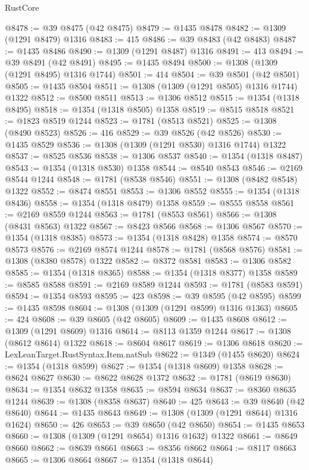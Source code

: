 \begin{lexlean}{RustCore}
\begin{coremodule}
@8478 := @39 @8475 (@42 @8475)
@8479 := @1435 @8478
@8482 := @1309 (@1291 @8479) @1316
@8483 := 415
@8486 := @39 @8483 (@42 @8483)
@8487 := @1435 @8486
@8490 := @1309 (@1291 @8487) @1316
@8491 := 413
@8494 := @39 @8491 (@42 @8491)
@8495 := @1435 @8494
@8500 := @1308 (@1309 (@1291 @8495) @1316 @1744)
@8501 := 414
@8504 := @39 @8501 (@42 @8501)
@8505 := @1435 @8504
@8511 := @1308 (@1309 (@1291 @8505) @1316 @1744) @1322
@8512 := @8500 @8511
@8513 := @1306 @8512
@8515 := @1354 (@1318 @8495)
@8518 := @1354 (@1318 @8505) @1358
@8519 := @8515 @8518
@8521 := @1823 @8519 @1244
@8523 := @1781 (@8513 @8521)
@8525 := @1308 (@8490 @8523)
@8526 := 416
@8529 := @39 @8526 (@42 @8526)
@8530 := @1435 @8529
@8536 := @1308 (@1309 (@1291 @8530) @1316 @1744) @1322
@8537 := @8525 @8536
@8538 := @1306 @8537
@8540 := @1354 (@1318 @8487)
@8543 := @1354 (@1318 @8530) @1358
@8544 := @8540 @8543
@8546 := @2169 @8544 @1244
@8548 := @1781 (@8538 @8546)
@8551 := @1308 (@8482 @8548) @1322
@8552 := @8474 @8551
@8553 := @1306 @8552
@8555 := @1354 (@1318 @8436)
@8558 := @1354 (@1318 @8479) @1358
@8559 := @8555 @8558
@8561 := @2169 @8559 @1244
@8563 := @1781 (@8553 @8561)
@8566 := @1308 (@8431 @8563) @1322
@8567 := @8423 @8566
@8568 := @1306 @8567
@8570 := @1354 (@1318 @8385)
@8573 := @1354 (@1318 @8428) @1358
@8574 := @8570 @8573
@8576 := @2169 @8574 @1244
@8578 := @1781 (@8568 @8576)
@8581 := @1308 (@8380 @8578) @1322
@8582 := @8372 @8581
@8583 := @1306 @8582
@8585 := @1354 (@1318 @8365)
@8588 := @1354 (@1318 @8377) @1358
@8589 := @8585 @8588
@8591 := @2169 @8589 @1244
@8593 := @1781 (@8583 @8591)
@8594 := @1354 @8593
@8595 := 423
@8598 := @39 @8595 (@42 @8595)
@8599 := @1435 @8598
@8604 := @1308 (@1309 (@1291 @8599) @1316 @1363)
@8605 := 424
@8608 := @39 @8605 (@42 @8605)
@8609 := @1435 @8608
@8612 := @1309 (@1291 @8609) @1316
@8614 := @8113 @1359 @1244
@8617 := @1308 (@8612 @8614) @1322
@8618 := @8604 @8617
@8619 := @1306 @8618
@8620 := LexLeanTarget.RustSyntax.Item.natSub
@8622 := @1349 (@1455 @8620)
@8624 := @1354 (@1318 @8599)
@8627 := @1354 (@1318 @8609) @1358
@8628 := @8624 @8627
@8630 := @8622 @8628 @1372
@8632 := @1781 (@8619 @8630)
@8634 := @1354 @8632 @1358
@8635 := @8594 @8634
@8637 := @8360 @8635 @1244
@8639 := @1308 (@8358 @8637)
@8640 := 425
@8643 := @39 @8640 (@42 @8640)
@8644 := @1435 @8643
@8649 := @1308 (@1309 (@1291 @8644) @1316 @1624)
@8650 := 426
@8653 := @39 @8650 (@42 @8650)
@8654 := @1435 @8653
@8660 := @1308 (@1309 (@1291 @8654) @1316 @1632) @1322
@8661 := @8649 @8660
@8662 := @8639 @8661
@8663 := @8356 @8662
@8664 := @8117 @8663
@8665 := @1306 @8664
@8667 := @1354 (@1318 @8644)

\end{coremodule}
\end{lexlean}
